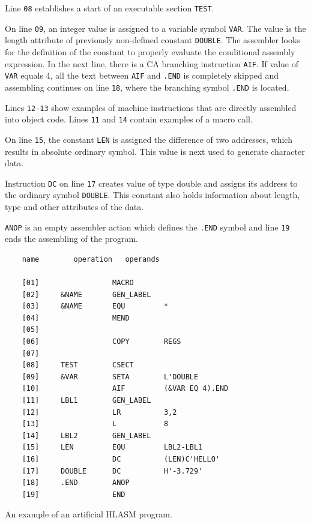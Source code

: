 Line \verb|08| establishes a start of an executable section \verb|TEST|. 

On line \verb|09|, an integer value is assigned to a variable symbol \verb|VAR|. The value is the length attribute of previously non-defined constant \verb|DOUBLE|. The assembler looks for the definition of the constant to properly evaluate the conditional assembly expression. In the next line, there is a CA branching instruction \verb|AIF|. If value of \verb|VAR| equals 4, all the text between \verb|AIF| and \verb|.END| is completely skipped and assembling continues on line \verb|18|, where the branching symbol \verb|.END| is located.

Lines \verb|12-13| show examples of machine instructions that are directly assembled into object code. Lines \verb|11| and \verb|14| contain examples of a macro call.

On line \verb|15|, the constant \verb|LEN| is assigned the difference of two addresses, which results in absolute ordinary symbol. This value is next used to generate character data.

Instruction \verb|DC| on line \verb|17| creates value of type double and assigns its address to the ordinary symbol \verb|DOUBLE|. This constant also holds information about length, type and other attributes of the data.  

\verb|ANOP| is an empty assembler action which defines the \verb|.END| symbol and line \verb|19| ends the assembling of the program. 

\begin{listing}[t]
	\begin{verbatim}
	name        operation   operands
	
	[01]                 MACRO                   
	[02]     &NAME       GEN_LABEL
	[03]     &NAME       EQU         *
	[04]                 MEND
	[05]             
	[06]                 COPY        REGS
	[07]             
	[08]     TEST        CSECT
	[09]     &VAR        SETA        L'DOUBLE
	[10]                 AIF         (&VAR EQ 4).END
	[11]     LBL1        GEN_LABEL
	[12]                 LR          3,2
	[13]                 L           8
	[14]     LBL2        GEN_LABEL
	[15]     LEN         EQU         LBL2-LBL1
	[16]                 DC          (LEN)C'HELLO'
	[17]     DOUBLE      DC          H'-3.729'
	[18]     .END        ANOP
	[19]                 END
	\end{verbatim} 
	\caption{An example of an artificial HLASM program.}
	\label{lst:example}
\end{listing}


